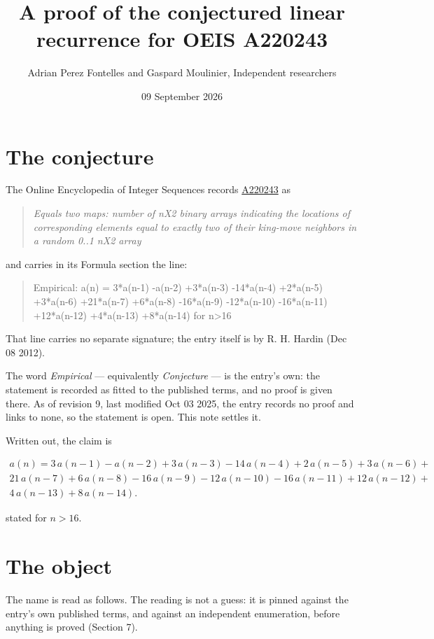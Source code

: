 \documentclass[11pt]{article}
\title{A proof of the conjectured linear recurrence for OEIS A220243}
\author{Adrian Perez Fontelles and Gaspard Moulinier, Independent researchers}
\date{09 September 2026}
\theoremstyle{definition}
\begin{document}
\maketitle
\section{The conjecture}

The Online Encyclopedia of Integer Sequences records \href{https://oeis.org/A220243}{A220243} as

\begin{quote}\itshape Equals two maps: number of nX2 binary arrays indicating the locations of corresponding elements equal to exactly two of their king-move neighbors in a random 0..1 nX2 array\end{quote}

and carries in its Formula section the line:

\begin{quote}\ttfamily Empirical: a(n) = 3*a(n-1) -a(n-2) +3*a(n-3) -14*a(n-4) +2*a(n-5) +3*a(n-6) +21*a(n-7) +6*a(n-8) -16*a(n-9) -12*a(n-10) -16*a(n-11) +12*a(n-12) +4*a(n-13) +8*a(n-14) for n>16\end{quote}

That line carries no separate signature; the entry itself is by R. H. Hardin (Dec 08 2012).

The word {\itshape Empirical} --- equivalently {\itshape Conjecture} --- is the entry's own: the statement is recorded as fitted to the published terms, and no proof is given there. As of revision 9, last modified Oct 03 2025, the entry records no proof and links to none, so the statement is open. This note settles it.

Written out, the claim is

\begin{multline*} a(n) = 3\,a(n-1) - a(n-2) + 3\,a(n-3) - 14\,a(n-4) + 2\,a(n-5) + 3\,a(n-6) + \\ 21\,a(n-7) + 6\,a(n-8) - 16\,a(n-9) - 12\,a(n-10) - 16\,a(n-11) + 12\,a(n-12) + \\ 4\,a(n-13) + 8\,a(n-14). \end{multline*}

stated for $n > 16$.

\section{The object}

The name is read as follows. The reading is not a guess: it is pinned against the entry's own published terms, and against an independent enumeration, before anything is proved (Section 7).
\end{document}
